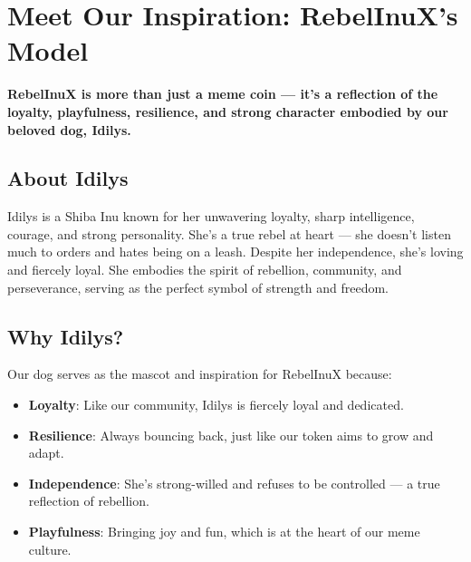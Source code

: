 \documentclass{article}
\begin{document}
\section[
\texorpdfstring{\color{primaryColor}Meet Our Inspiration: RebelInuX’s Model}{Meet Our Inspiration: RebelInuX’s Model}
]{\color{primaryColor}\textbf{Meet Our Inspiration: RebelInuX’s Model}}
\begin{tcolorbox}[colback=headerColor!10!white, colframe=headerColor, boxrule=0.8mm, width=\textwidth, arc=6mm, left=8mm, right=8mm, top=6mm, bottom=6mm]

\textbf{RebelInuX is more than just a meme coin — it’s a reflection of the loyalty, playfulness, resilience, and strong character embodied by our beloved dog, Idilys.}

\subsection*{About Idilys}

Idilys is a Shiba Inu known for her unwavering loyalty, sharp intelligence, courage, and strong personality. She’s a true rebel at heart — she doesn’t listen much to orders and hates being on a leash. Despite her independence, she’s loving and fiercely loyal. She embodies the spirit of rebellion, community, and perseverance, serving as the perfect symbol of strength and freedom.

\subsection*{Why Idilys?}

Our dog serves as the mascot and inspiration for RebelInuX because:

\begin{itemize}
  \item \textbf{Loyalty}: Like our community, Idilys is fiercely loyal and dedicated.
  \item \textbf{Resilience}: Always bouncing back, just like our token aims to grow and adapt.
  \item \textbf{Independence}: She’s strong-willed and refuses to be controlled — a true reflection of rebellion.
  \item \textbf{Playfulness}: Bringing joy and fun, which is at the heart of our meme culture.
\end{itemize}

\end{tcolorbox}

\end{document}
